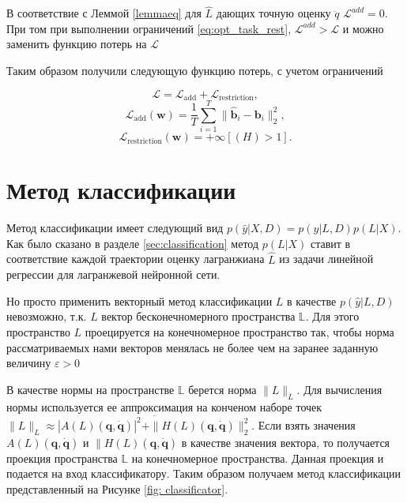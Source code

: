 \documentclass[a4paper, 12pt]{article}
\renewcommand{\epsilon}{\ensuremath{\varepsilon}}
\begin{document}
В соответствие с Леммой \ref{lemmaeq} для $\hat{L}$ дающих точную оценку $\ddot{q}$ $\mathcal{L}^{add} = 0$. При том при выполнении ограничений \eqref{eq:opt_task_rest}, $\mathcal{L}^{add} > \mathcal{L}$ и можно заменить функцию потерь на $\mathcal{L}$

Таким образом получили следующую функцию потерь, с учетом ограничений

\begin{equation}
    \mathcal{L} = \mathcal{L}_\text{add} + \mathcal{L}_\text{restriction},
\end{equation}
\begin{equation}
    \mathcal{L}_\text{add}(\textbf{w}) = \frac{1}{T}\sum_{i=1}^{T} \| \mathbf{\hat{b}}_i - \mathbf{b}_i \|_2^2,
\end{equation}
\begin{equation}
    \mathcal{L}_\text{restriction}(\textbf{w}) = +\infty[\left(H\right) > 1].
\end{equation}

\section {Метод классификации}

Метод классификации имеет следующий вид $p(\hat{y}|X, D) = p(\hat{y}|L, D)p(L|X)$. Как было сказано в разделе \ref{sec:classification} метод $p(L|X)$ ставит в соответствие каждой траектории оценку лагранжиана $\hat{L}$ из задачи линейной регрессии для лагранжевой нейронной сети. 

Но просто применить векторный метод классификации $L$ в качестве $p(\hat{y}|L, D)$ невозможно, т.к. $L$ вектор бесконечномерного пространства $\mathbb{L}$. Для этого пространство $L$ проецируется на конечномерное пространство так, чтобы норма рассматриваемых нами векторов менялась не более чем на заранее заданную величину $\epsilon > 0$

В качестве нормы на пространстве $\mathbb{L}$ берется норма $\|L\|_L$. Для вычисления нормы используется ее аппроксимация на конченом наборе точек $\|L\|_L \approx \overline{|A(L)\left(\mathbf{q}, \dot{\mathbf{q}}\right)|^2 + \|H(L)\left(\mathbf{q}, \dot{\mathbf{q}}\right)\|_2^2}$. Если взять значения $A(L)\left(\mathbf{q}, \dot{\mathbf{q}}\right)$ и $\|H(L)\left(\mathbf{q}, \dot{\mathbf{q}}\right)$ в качестве значения вектора, то получается проекция пространства $\mathbb{L}$ на конечномерное пространства. Данная проекция и подается на вход классификатору. Таким образом получаем метод классификации представленный на Рисунке \ref{fig: classificator}.
\end{document}
